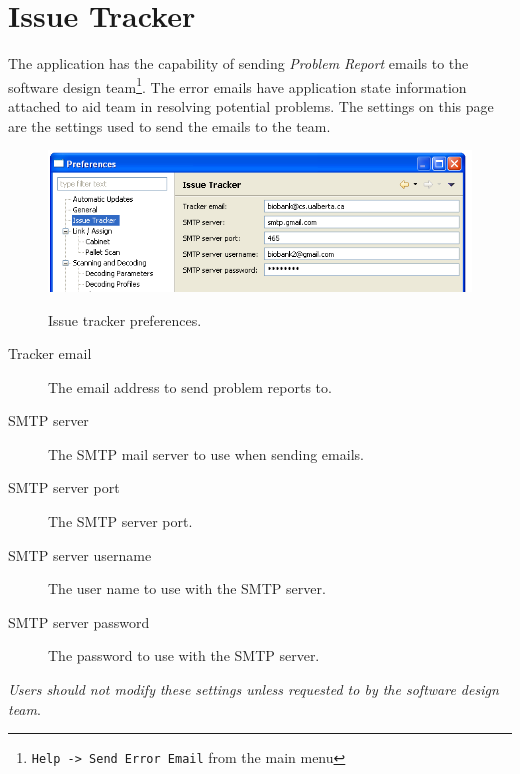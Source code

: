 \section{Issue Tracker}
The application has the capability of sending \emph{Problem Report} emails to
the software design team\footnote{\texttt{Help -> Send Error Email} from the
  main menu}. The error emails have application state information attached to
aid team in resolving potential problems. The settings on this page are the
settings used to send the emails to the team.
    \begin{figure}[H]
      \centering
      \scalebox{0.5}
      { \includegraphics*{screenshots/configuration/prefs_issue_tracker} }
      \caption{Issue tracker preferences.}
      \label{fig:prefs_issue_tracker}
    \end{figure}
\begin{description}
  \item[Tracker email] The email address to send problem reports to.
  \item[SMTP server] The SMTP mail server to use when sending emails.
  \item[SMTP server port] The SMTP server port.
  \item[SMTP server username] The user name to use with the SMTP server.
  \item[SMTP server password] The password to use with the SMTP server.
\end{description}
\textit{Users should not modify these settings unless requested to by the software
  design team}.

